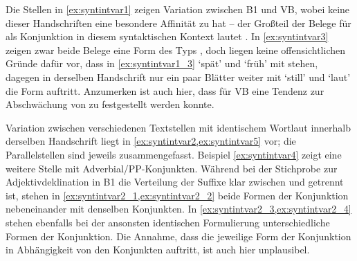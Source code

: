 Die Stellen in \cref{ex:syntintvar1} zeigen Variation zwischen B1
und VB, wobei keine dieser Handschriften eine besondere Affinität zu
 hat -- der Großteil der Belege für  als
Konjunktion in diesem syntaktischen Kontext lautet . In
\cref{ex:syntintvar3} zeigen zwar beide Belege eine Form des Typs
, doch liegen keine offensichtlichen Gründe dafür vor, dass in
\cref{ex:syntintvar1_3}  `spät' und  `früh'
mit  stehen, dagegen in der\-selben Handschrift nur ein paar Blätter
weiter mit  `still' und  `laut' die Form
 auftritt. Anzumerken ist auch hier, dass für VB eine
Tendenz zur Abschwächung von  zu  festgestellt werden
konnte.

Variation zwischen verschiedenen Textstellen mit identischem Wortlaut innerhalb
der\-selben Handschrift liegt in \cref{ex:syntintvar2,ex:syntintvar5} vor; die
Parallelstellen sind jeweils zusammengefasst. Beispiel \cref{ex:syntintvar4}
zeigt eine weitere Stelle mit Adverbial/PP-Konjunkten. Während bei der
Stichprobe zur Adjektivdeklination in B1 die Verteilung der Suffixe
klar zwischen  und  getrennt ist, stehen in
\cref{ex:syntintvar2_1,ex:syntintvar2_2} beide Formen der Konjunktion
nebeneinander mit denselben Konjunkten. In
\cref{ex:syntintvar2_3,ex:syntintvar2_4} stehen ebenfalls bei der ansonsten
identischen Formulierung unterschiedliche Formen der Konjunktion. Die Annahme,
dass die jeweilige Form der Konjunktion in Abhängigkeit von den Konjunkten
auftritt, ist auch hier unplausibel.


